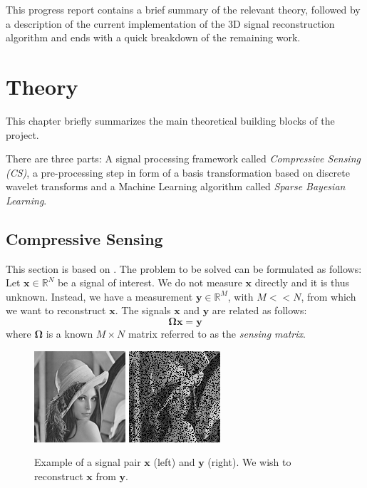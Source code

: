 \documentclass[final,3p]{report}
\let\bs\boldsymbol
\begin{document}
This progress report contains a brief summary of the relevant theory, followed by a description of the current implementation of the 3D signal reconstruction algorithm and ends with a quick breakdown of the remaining work.


\chapter{Theory}
This chapter briefly summarizes the main theoretical building blocks of the project.

There are three parts: A signal processing framework called \emph{Compressive Sensing (CS)}, a pre-processing step in form of a basis transformation based on discrete wavelet transforms and a Machine Learning algorithm called \emph{Sparse Bayesian Learning}.

\section{Compressive Sensing}
This section is based on \cite{pilikos2014}. 
The problem to be solved can be formulated as follows: Let $\bs x \in \mathbb{R}^N$ be a signal of interest.
We do not measure $\bs x$ directly and it is thus unknown.
Instead, we have a measurement $\bs y \in \mathbb{R}^M$, with $M << N$, from which we want to reconstruct $\bs x$.
The signals $\bs x$ and $\bs y$ are related as follows:
\begin{equation}
\label{eqn:CS}
\bs \Omega \bs x = \bs y
\end{equation}
where $\bs \Omega$ is a known $M\times N$ matrix referred to as the \emph{sensing matrix}.

\begin{figure}
\label{fig:lenna}
\center
\includegraphics{128.png}
\includegraphics{0.png}
\caption{Example of a signal pair $\bs x$ (left) and $\bs y$ (right). We wish to reconstruct $\bs x$ from $\bs y$.}
\end{figure}
\end{document}
